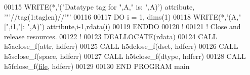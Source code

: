 \begin{DoxyCode}
00115   \textcolor{keyword}{WRITE}(*,\textcolor{stringliteral}{'("Datatype tag for ",A," is: ",A)'}) attribute, \textcolor{stringliteral}{'"'}//tag(1:taglen)//\textcolor{stringliteral}{'"'}
00116 
00117   \textcolor{keywordflow}{DO} i = 1, dims(1)
00118      \textcolor{keyword}{WRITE}(*,\textcolor{stringliteral}{'(A,"[",i1,"]: ",A)'}) attribute,i-1,rdata(i)
00119 \textcolor{keywordflow}{  ENDDO}
00120   \textcolor{comment}{!}
00121   \textcolor{comment}{! Close and release resources.}
00122   \textcolor{comment}{!}
00123   \textcolor{keyword}{DEALLOCATE}(rdata)
00124   \textcolor{keyword}{CALL }h5aclose\_f(attr, hdferr)
00125   \textcolor{keyword}{CALL }h5dclose\_f(dset, hdferr)
00126   \textcolor{keyword}{CALL }h5sclose\_f(space, hdferr)
00127   \textcolor{keyword}{CALL }h5tclose\_f(dtype, hdferr)
00128   \textcolor{keyword}{CALL }h5fclose\_f(\hyperlink{structfile}{file}, hdferr)
00129 
00130 \textcolor{keyword}{END PROGRAM }main
\end{DoxyCode}
